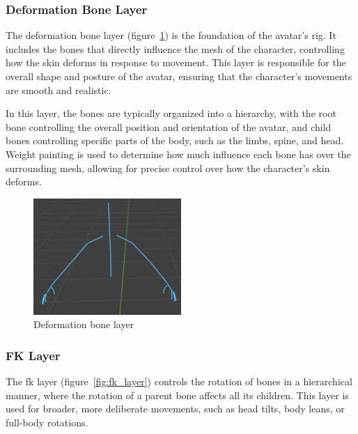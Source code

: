 \documentclass[../../main.tex]{subfiles}
\begin{document}
\subsubsection{Deformation Bone Layer}
\label{ch:avatar_creation_pose_synthesis:proc_rig_signing_avatars:bone_layers:deform_bone_layer}

The deformation bone layer (figure~\ref{fig:deform_layer}) is the foundation of the avatar's rig. It includes the bones that directly influence the mesh of the character, controlling how the skin deforms in response to movement. This layer is responsible for the overall shape and posture of the avatar, ensuring that the character's movements are smooth and realistic.

In this layer, the bones are typically organized into a hierarchy, with the root bone controlling the overall position and orientation of the avatar, and child bones controlling specific parts of the body, such as the limbs, spine, and head. Weight painting is used to determine how much influence each bone has over the surrounding mesh, allowing for precise control over how the character's skin deforms.

\begin{figure}
    \centering
    \includegraphics[width=0.5\textwidth]{chapters/avatar_creation_pose_synthesis/images/deform_layer.png}
    \caption{Deformation bone layer}
    \label{fig:deform_layer}
\end{figure}

\subsubsection{FK Layer}
\label{ch:avatar_creation_pose_synthesis:proc_rig_signing_avatars:bone_layers:fk_layer}

The \gls{fk} layer (figure~\ref{fig:fk_layer}) controls the rotation of bones in a hierarchical manner, where the rotation of a parent bone affects all its children. This layer is used for broader, more deliberate movements, such as head tilts, body leans, or full-body rotations.
\end{document}
